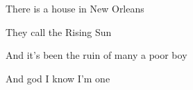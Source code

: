 \begin{song}
\bigskip

There is a house in New Orleans  \par
They call the Rising Sun  \par
And it’s been the ruin of many a poor boy \par
And god I know I’m one  \par
{}    \par
{} \par

\end{song}

